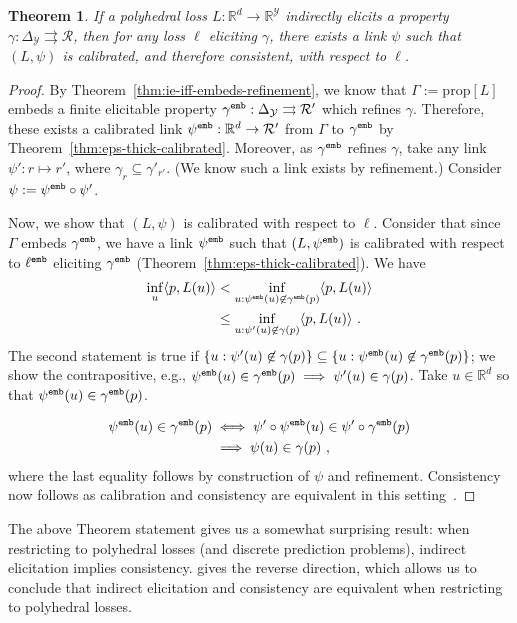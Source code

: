 \documentclass[12pt]{article}
\newcommand{\reals}{\mathbb{R}}
\newcommand{\prop}[1]{\mathrm{prop}[#1]}
\newcommand{\simplex}{\Delta_\Y}
\newcommand{\R}{\mathcal{R}}
\newcommand{\Y}{\mathcal{Y}}
\newcommand{\inprod}[2]{\langle #1, #2 \rangle}%
\newcommand{\toto}{\rightrightarrows}
\newcommand{\emb}{{\tt emb}}
\newtheorem{theorem}{Theorem}
\begin{document}
\begin{theorem}\label{thm:poly-ie-implies-consistent}
	If a polyhedral loss $L:\reals^d \to \reals^\Y$ indirectly elicits a property $\gamma: \simplex \toto \R$, then for any loss $\ell$ eliciting $\gamma$, there exists a link $\psi$ such that $(L, \psi)$ is calibrated, and therefore consistent, with respect to $\ell$.
\end{theorem}
\begin{proof}
	By Theorem~\ref{thm:ie-iff-embeds-refinement}, we know that $\Gamma := \prop{L}$ embeds a finite elicitable property $\gamma^\emb:\simplex \toto \R'$ which refines $\gamma$.
	Therefore, these exists a calibrated link $\psi^\emb : \reals^d \to \R'$ from $\Gamma$ to $\gamma^\emb$ by Theorem~\ref{thm:eps-thick-calibrated}. Moreover, as $\gamma^\emb$ refines $\gamma$, take any link $\psi': r \mapsto r'$, where $\gamma_r \subseteq \gamma'_{r'}$. 
	(We know such a link exists by refinement.)
	Consider $\psi := \psi^\emb \circ \psi'$.
	
	Now, we show that $(L, \psi)$ is calibrated with respect to $\ell$.
	Consider that since $\Gamma$ embeds $\gamma^\emb$, we have a link $\psi^\emb$ such that $(L,\psi^\emb)$ is calibrated with respect to $\ell^\emb$ eliciting $\gamma^\emb$ (Theorem~\ref{thm:eps-thick-calibrated}).
	We have
	\begin{align*}
	\inf_{u}\inprod{p}{L(u)} &< \inf_{u : \psi^\emb(u) \not \in \gamma^\emb(p)} \inprod{p}{L(u)}\\
	&\leq \inf_{u : \psi'(u) \not \in \gamma(p)} \inprod{p}{L(u)}~.~
	\end{align*}
	The second statement is true if $\{u : \psi'(u) \not \in \gamma(p) \} \subseteq \{u : \psi^\emb(u) \not \in \gamma^\emb(p) \}$; we show the contrapositive, e.g., $\psi^\emb(u) \in \gamma^\emb(p) \implies \psi'(u) \in \gamma(p)$.
	Take $u \in \reals^d$ so that $\psi^\emb(u) \in \gamma^\emb(p)$.
	
	\begin{align*}
	\psi^\emb(u) \in \gamma^\emb(p) &\iff \psi' \circ \psi^\emb(u) \in \psi' \circ \gamma^\emb(p)\\
	&\implies \psi(u) \in \gamma(p)~,~
	\end{align*}
	where the last equality follows by construction of $\psi$ and refinement.
	Consistency now follows as calibration and consistency are equivalent in this setting~\citep{bartlett2006convexity}.
\end{proof}

The above Theorem statement gives us a somewhat surprising result: when restricting to polyhedral losses (and discrete prediction problems), indirect elicitation implies consistency.
\citet{finocchiaro2021unifying} gives the reverse direction, which allows us to conclude that indirect elicitation and consistency are equivalent when restricting to polyhedral losses.
\end{document}
